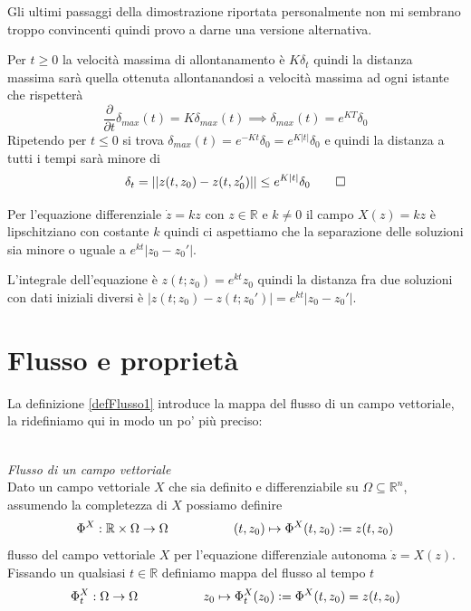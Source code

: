 \documentclass[11pt,a4paper,twoside]{book}
\newenvironment{definizione}[1][\empty]{\begin{Definizione}{
\ifx\empty#1\relax\else\mdseries\itshape#1\\\fi
}{}}{\end{Definizione}}
\newenvironment{esempio}[1][Esempio]{ 
  \begin{center}\begin{tcolorbox}[
  title={#1:\\},
  width=0.9\linewidth,
  flush right,
  enhanced jigsaw, 
  colback=white, 
  frame hidden, 
  sharpish corners, arc=3mm,
  borderline west = {1pt}{0pt}{gray},
  borderline south = {1pt}{0pt}{gray},
  coltitle=black, 
  fonttitle=\small\bfseries, 
  attach title to upper, 
  breakable,
  top=2.5pt, bottom=0.3pt]\small
  }{
 \normalsize \end{tcolorbox}\end{center}
}
\theoremstyle{esss}
\theoremstyle{dotless}
\numberwithin{equation}{section} %
\begin{document}
\vfill
\begin{footnotesize}

Gli ultimi passaggi della dimostrazione riportata personalmente non mi sembrano troppo convincenti quindi provo a darne una versione alternativa.

Per $t\geq0$ la velocità massima di allontanamento è $K\delta_t$ quindi la distanza massima sarà quella ottenuta allontanandosi a velocità massima ad ogni istante che rispetterà
\[
\dfrac{\partial}{\partial t}\delta_{max}(t)= K \delta_{max}(t) \implies \delta_{max}(t)=e^{KT}\delta_0
\]
Ripetendo per $t\leq0$ si trova $\delta_{max}(t)=e^{-Kt}\delta_0=e^{K \left| t \right|}\delta_0$ e quindi la distanza a tutti i tempi sarà minore di
\[
\delta_t = \left|\left|  z(t,z_0)-z(t,z'_0) \right|\right|\leq e^{K\left|t\right|}\delta_0
\qedhere 
\]
\end{footnotesize}

\begin{esempio}
Per l'equazione differenziale $\dot{z}=kz$ con $z\in\mathbb{R}$ e $k\neq 0$ il campo $X(z)=kz$ è lipschitziano con costante $k$ quindi ci aspettiamo che la separazione delle soluzioni sia minore o uguale a $e^{kt} |z_0-z_0'|$.

L'integrale dell'equazione è $z(t;z_0)=e^{kt}z_0$ quindi la distanza fra due soluzioni con dati iniziali diversi è $|z(t;z_0)-z(t;z_0')|=e^{kt} |z_0-z_0'|$.
\end{esempio}

\section{Flusso e proprietà}

La definizione \ref{defFlusso1} introduce la mappa del flusso di un campo vettoriale, la ridefiniamo qui in modo un po' più preciso:

\begin{definizione}\textit{Flusso di un campo vettoriale}\\
Dato un campo vettoriale $X$ che sia definito e differenziabile su $\Omega\subseteq\mathbb{R}^n$, assumendo la completezza di $X$ possiamo definire
\[
\Phi^X:\mathbb{R}\times\Omega\rightarrow\Omega \hspace{0.15\linewidth} (t,z_0)\mapsto\Phi^X(t,z_0)\mathrel{\mathop:}=z(t,z_0)
\]
flusso del campo vettoriale $X$ per l'equazione differenziale autonoma $\dot{z}=X(z)$.
Fissando un qualsiasi $t\in\mathbb{R}$ definiamo mappa del flusso al tempo $t$ 
\[
\Phi^X_t:\Omega\rightarrow\Omega \hspace{0.15\linewidth} z_0\mapsto\Phi^X_t(z_0)\mathrel{\mathop:}=\Phi^X(t,z_0)=z(t,z_0)
\]
\end{definizione}
\end{document}
